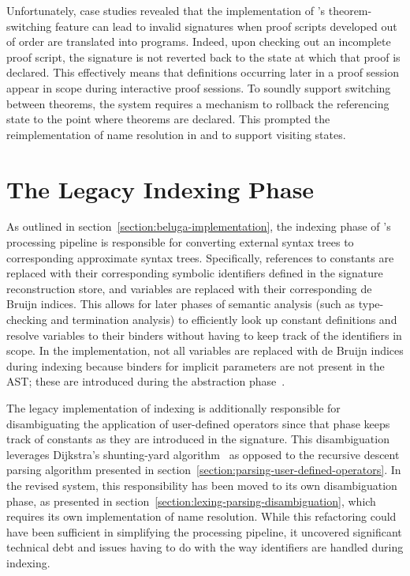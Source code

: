 Unfortunately, case studies revealed that the implementation of \Harpoon's theorem-switching feature can lead to invalid \Beluga signatures when proof scripts developed out of order are translated into programs.
Indeed, upon checking out an incomplete proof script, the signature is not reverted back to the state at which that proof is declared.
This effectively means that definitions occurring later in a proof session appear in scope during interactive proof sessions.
To soundly support switching between theorems, the \Beluga system requires a mechanism to rollback the referencing state to the point where theorems are declared.
This prompted the reimplementation of name resolution in \Beluga and \Harpoon to support visiting states.

\section{The Legacy Indexing Phase}


As outlined in section~\ref{section:beluga-implementation}, the indexing phase of \Beluga's processing pipeline is responsible for converting external syntax trees to corresponding approximate syntax trees.
Specifically, references to constants are replaced with their corresponding symbolic identifiers defined in the signature reconstruction store, and variables are replaced with their corresponding de Bruijn indices.
This allows for later phases of semantic analysis (such as type-checking and termination analysis) to efficiently look up constant definitions and resolve variables to their binders without having to keep track of the identifiers in scope.
In the implementation, not all variables are replaced with de Bruijn indices during indexing because binders for implicit parameters are not present in the \ac{AST}; these are introduced during the abstraction phase~\cite{germain2010implementation}.



The legacy implementation of indexing is additionally responsible for disambiguating the application of user-defined operators since that phase keeps track of constants as they are introduced in the signature.
This disambiguation leverages Dijkstra's shunting-yard algorithm~\cite{dijkstra1961algol} as opposed to the recursive descent parsing algorithm presented in section~\ref{section:parsing-user-defined-operators}.
In the revised system, this responsibility has been moved to its own disambiguation phase, as presented in section~\ref{section:lexing-parsing-disambiguation}, which requires its own implementation of name resolution.
While this refactoring could have been sufficient in simplifying the processing pipeline, it uncovered significant technical debt and issues having to do with the way identifiers are handled during indexing.

